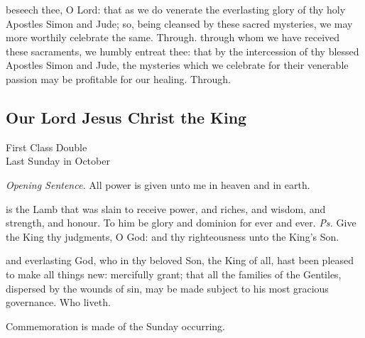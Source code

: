 \secret
{} beseech thee, O Lord: that as we do venerate the everlasting glory of thy holy Apostles Simon and Jude; so, being cleansed by these sacred mysteries, we may more worthily celebrate the same. Through.
\postcommunion
{} through whom we have received these sacraments, we humbly entreat thee: that by the intercession of thy blessed Apostles Simon and Jude, the mysteries which we celebrate for their venerable passion may be profitable for our healing. Through.

\subsection{Our Lord Jesus Christ the King}
\begin{inhead}
    {First Class Double\\
Last Sunday in October}
\end{inhead}
\fancyhead[RE,LO]{}
\par\noindent
\textit{Opening Sentence.} All power is given unto me in heaven and in earth.

\introit
{} is the Lamb that was slain to receive power, and riches, and wisdom, and strength, and honour. To him be glory and dominion for ever and ever. \textit{Ps.} Give the King thy judgments, O God: and thy righteousness unto the King's Son.

\collect
{} and everlasting God, who in thy beloved Son, the King of all, hast been pleased to make all things new: mercifully grant; that all the families of the Gentiles, dispersed by the wounds of sin, may be made subject to his most gracious governance. Who liveth.
\begin{rubric}
    Commemoration is made of the Sunday occurring.
\end{rubric}

